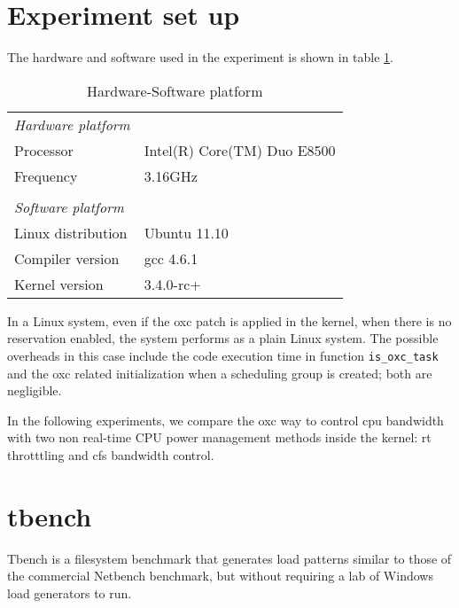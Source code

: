 \section{Experiment set up}

The hardware and software used in the experiment is shown in 
table \ref{tab:exp_setup}.
\begin{table}[hbp]
  \centering
  \begin{tabular}{ll}\hline
	\emph{Hardware platform}\hspace{4cm}		& 	\\
	Processor			& Intel(R) Core(TM) Duo E8500	 \\
	Frequency			& 3.16GHz\\
					&	\\	
	\emph{Software platform}\hspace{4cm}		& 	\\
	Linux distribution		& Ubuntu 11.10\\
	Compiler version		& gcc 4.6.1\\
	Kernel version			& 3.4.0-rc+ \\\hline
  \end{tabular}
  \caption{Hardware-Software platform}
  \label{tab:exp_setup}
\end{table}

In a Linux system, even if the oxc patch is applied in the kernel, when there is
no reservation enabled, the system performs as a plain Linux system. The possible
overheads in this case include the code execution time in function 
\texttt{is\_oxc\_task} and the oxc related initialization when a scheduling group
is created; both are negligible.

In the following experiments, we compare the oxc way to control cpu bandwidth 
with two non real-time CPU power management methods inside the kernel: 
rt throtttling and cfs bandwidth control.
%
%
\section{tbench}
Tbench is a filesystem benchmark that generates load patterns similar to those
of the commercial Netbench benchmark, but without requiring a lab of Windows
load generators to run.




